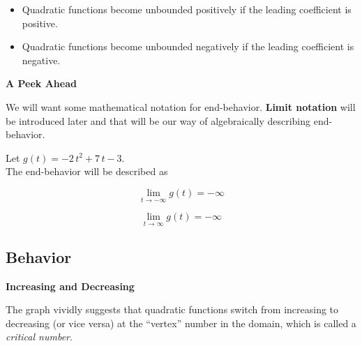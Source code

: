 \documentclass{ximera}
\begin{document}
\begin{itemize}
     \item Quadratic functions become unbounded positively if the leading coefficient is positive.
     \item Quadratic functions become unbounded negatively if the leading coefficient is negative.
\end{itemize}



\begin{idea} \textbf{\textcolor{red!80!black}{A Peek Ahead}}

We will want some mathematical notation for end-behavior.  \textbf{Limit notation} will be introduced later and that will be our way of algebraically describing end-behavior. \\




\begin{example}

Let $g(t) = -2 \, t^2 + 7 \, t - 3$. \\


The end-behavior will be described as 

\[
\lim\limits_{t \to -\infty} g(t) = -\infty
\]


\[
\lim\limits_{t \to \infty} g(t) = -\infty
\]

\end{example}




\end{idea}

















\subsection*{Behavior}



\textbf{\textcolor{blue!55!black}{Increasing and Decreasing}}






The graph vividly suggests that quadratic functions switch from increasing to decreasing (or vice versa) at the ``vertex'' number in the domain, which is called a \textit{critical number}.
\end{document}
